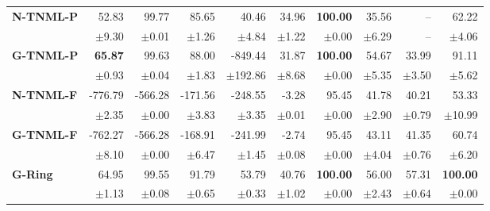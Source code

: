 \begin{table}[!htbp]
\begin{tabular}{lrrrrr||rrrr}
\midrule
\textbf{N-TNML-P} & 52.83 & 99.77 & 85.65 & 40.46 & 34.96 & \textbf{100.00} & 35.56 & -- & 62.22 \\
 & $\pm$9.30 & $\pm$0.01 & $\pm$1.26 & $\pm$4.84 & $\pm$1.22 & $\pm$0.00 & $\pm$6.29 & -- & $\pm$4.06 \\
\midrule
\textbf{G-TNML-P} & \textbf{65.87} & 99.63 & 88.00 & -849.44 & 31.87 & \textbf{100.00} & 54.67 & 33.99 & 91.11 \\
 & $\pm$0.93 & $\pm$0.04 & $\pm$1.83 & $\pm$192.86 & $\pm$8.68 & $\pm$0.00 & $\pm$5.35 & $\pm$3.50 & $\pm$5.62 \\
\midrule
\textbf{N-TNML-F} & -776.79 & -566.28 & -171.56 & -248.55 & -3.28 & 95.45 & 41.78 & 40.21 & 53.33 \\
 & $\pm$2.35 & $\pm$0.00 & $\pm$3.83 & $\pm$3.35 & $\pm$0.01 & $\pm$0.00 & $\pm$2.90 & $\pm$0.79 & $\pm$10.99 \\
\midrule
\textbf{G-TNML-F} & -762.27 & -566.28 & -168.91 & -241.99 & -2.74 & 95.45 & 43.11 & 41.35 & 60.74 \\
 & $\pm$8.10 & $\pm$0.00 & $\pm$6.47 & $\pm$1.45 & $\pm$0.08 & $\pm$0.00 & $\pm$4.04 & $\pm$0.76 & $\pm$6.20 \\
\midrule
\textbf{G-Ring} & 64.95 & 99.55 & 91.79 & 53.79 & 40.76 & \textbf{100.00} & 56.00 & 57.31 & \textbf{100.00} \\
 & $\pm$1.13 & $\pm$0.08 & $\pm$0.65 & $\pm$0.33 & $\pm$1.02 & $\pm$0.00 & $\pm$2.43 & $\pm$0.64 & $\pm$0.00 \\
\midrule
\bottomrule
\end{tabular}
\end{table}